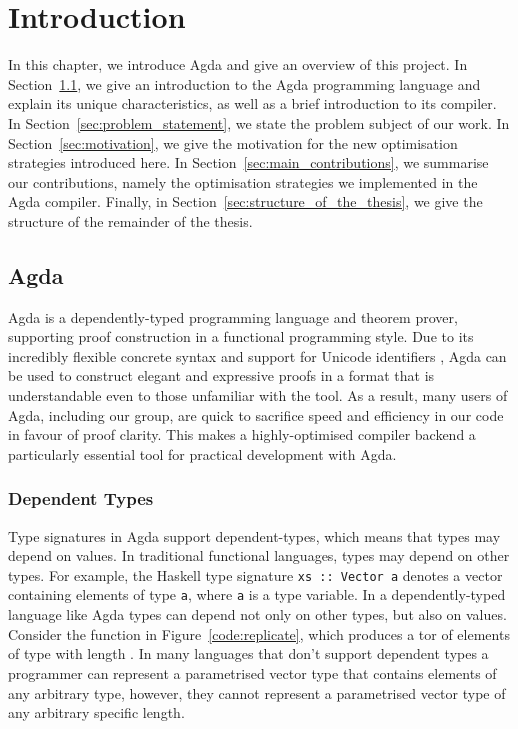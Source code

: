 \chapter{Introduction}
\label{cha:introduction}

In this chapter, we introduce Agda and give an overview of this project. In Section~\ref{sec:intro_agda}, we give an introduction to the Agda programming language and explain its unique characteristics, as well as a brief introduction to its compiler. In Section~\ref{sec:problem_statement}, we state the problem subject of our work. In Section~\ref{sec:motivation}, we give the motivation for the new optimisation strategies introduced here. In Section~\ref{sec:main_contributions}, we summarise our contributions, namely the optimisation strategies we implemented in the Agda compiler. Finally, in Section~\ref{sec:structure_of_the_thesis}, we give the structure of the remainder of the thesis.

\section{Agda}
\label{sec:intro_agda}

Agda \citep{Norell-2007} is a dependently-typed programming language and theorem prover, supporting proof construction in a functional programming style. Due to its incredibly flexible concrete syntax and support for Unicode identifiers \citep{bove2009}, Agda can be used to construct elegant and expressive proofs in a format that is understandable even to those unfamiliar with the tool. As a result, many users of Agda, including our group, are quick to sacrifice speed and efficiency in our code in favour of proof clarity. This makes a highly-optimised compiler backend a particularly essential tool for practical development with Agda.

\subsection{Dependent Types}

Type signatures in Agda support dependent-types, which means that types may depend on values. In traditional functional languages, types may depend on other types. For example, the Haskell type signature \lstinline{xs :: Vector a} denotes a vector containing elements of type \lstinline{a}, where \lstinline{a} is a type variable. In a dependently-typed language like Agda types can depend not only on other types, but also on values. Consider the  function in Figure~\ref{code:replicate}, which produces a tor of elements of type  with length .\citep{norell2009} In many languages that don't support dependent types a programmer can represent a parametrised vector type that contains elements of any arbitrary type, however, they cannot represent a parametrised vector type of any arbitrary specific length.

